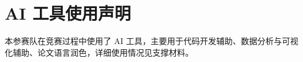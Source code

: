 \documentclass[withoutpreface,bwprint]{cumcmthesis}
\begin{document}
\begin{abstract}
\textbf{针对问题四}，进一步考虑外网电价的实时波动，将问题二、三的购电策略推广至随机电价环境。首先，根据电价的跨日水平变化和日内峰谷特征，将电价分解为日价格水平与归一化日内形状；其次，将电价预测残差与负载、光伏残差按照同一历史信息状态进行三通道配对，构造保留供需--价格相关性的联合场景，并分别沿用问题二的 0:00 冻结采购权限和问题三的日内滚动调整权限求解。48\,h 主方法下，两类策略全年实际费用分别为 \textbf{1422.99 万元}和 \textbf{1369.30 万元}；在 24\,h 同口径比较中，与完美价格信息参照的费用差分别为 0.62\% 和 0.68\%。进一步证明，当全部价格输入及相应费用系数按同一正常数缩放时，最优采购解集、库存保留水平和执行动作保持不变。

综上，四类策略均以真实运行数据结算的实际费用作为评价依据。进一步的灵敏度分析与组件比较表明，场景数达到 20 后全年费用趋于稳定，48\,h 跨日价值处理在各类策略中均能降低实际费用；模型参数仅依据评分期前信息确定，全年回测严格遵循信息时序，验证了模型结果的稳定性与策略的时序可实施性。
\end{abstract}










\section*{AI 工具使用声明}
本参赛队在竞赛过程中使用了 AI 工具，主要用于代码开发辅助、数据分析与可视化辅助、论文语言润色，详细使用情况见支撑材料。
\end{document}
